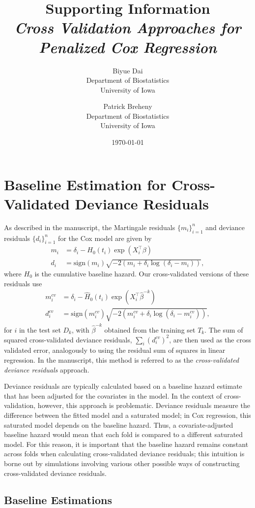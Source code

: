 \documentclass{article}
\title{Supporting Information\\
\textit{Cross Validation Approaches for Penalized Cox Regression}}
\author{Biyue Dai\\Department of Biostatistics\\University of Iowa
  \and
  Patrick Breheny\\Department of Biostatistics\\University of Iowa}
\date{\today}
\providecommand{\Tr}{^{\scriptscriptstyle\top}}
\begin{document}
\maketitle

\section{Baseline Estimation for Cross-Validated Deviance Residuals}

As described in the manuscript, the Martingale residuals $\{m_i\}_{i=1}^n$ and deviance residuals $\{d_i\}_{i=1}^n$ for the Cox model are given by
\begin{align*}
  m_{i} &= \delta_{i} - H_{0}(t_{i})\exp(X_i\Tr\beta) \\
  d_{i} &= \text{sign}(m_{i})\sqrt{-2(m_i + \delta_{i}\log(\delta_{i} - m_i))},
\end{align*}
where $H_0$ is the cumulative baseline hazard.  Our cross-validated versions of these residuals use
\begin{align*}
  m_{i}^{cv} &= \delta_{i} - \hat{H}_{0}(t_{i})\exp(X_i\Tr\hat\beta^{-k}) \\
  d_{i}^{cv} &= \text{sign}(m_{i}^{cv})\sqrt{-2(m_i^{cv} + \delta_{i}\log(\delta_{i} - m_i^{cv}))},
\end{align*}
for $i$ in the test set $D_k$, with $\hat{\beta}^{-k}$ obtained from the training set $T_k$.  The sum of squared cross-validated deviance residuals, $\sum_{i}(d_{i}^{cv})^2$, are then used as the cross validated error, analogously to using the residual sum of squares in linear regression.  In the manuscript, this method is referred to as the \emph{cross-validated deviance residuals} approach.

Deviance residuals are typically calculated based on a baseline hazard estimate that has been adjusted for the covariates in the model. In the context of cross-validation, however, this approach is problematic. Deviance residuals measure the difference between the fitted model and a saturated model; in Cox regression, this saturated model depends on the baseline hazard. Thus, a covariate-adjusted baseline hazard would mean that each fold is compared to a different saturated model. For this reason, it is important that the baseline hazard remains constant across folds when calculating cross-validated deviance residuals; this intuition is borne out by simulations involving various other possible ways of constructing cross-validated deviance residuals.  

\subsection{Baseline Estimations}
\end{document}
